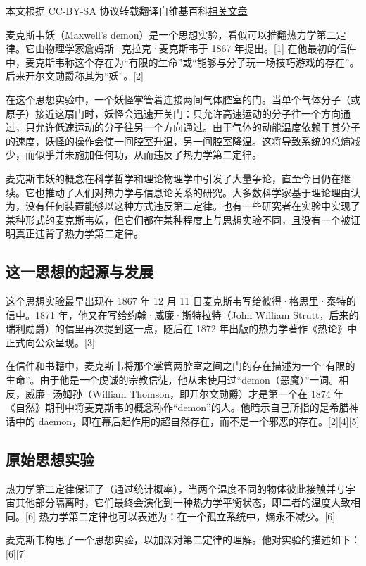 
本文根据 CC-BY-SA 协议转载翻译自维基百科\href{https://en.wikipedia.org/wiki/Maxwell\%27s_demon}{相关文章}

麦克斯韦妖（Maxwell's demon）是一个思想实验，看似可以推翻热力学第二定律。它由物理学家詹姆斯·克拉克·麦克斯韦于 1867 年提出。[1] 在他最初的信件中，麦克斯韦称这个存在为“有限的生命”或“能够与分子玩一场技巧游戏的存在”。后来开尔文勋爵称其为“妖”。[2]

在这个思想实验中，一个妖怪掌管着连接两间气体腔室的门。当单个气体分子（或原子）接近这扇门时，妖怪会迅速开关门：只允许高速运动的分子往一个方向通过，只允许低速运动的分子往另一个方向通过。由于气体的动能温度依赖于其分子的速度，妖怪的操作会使一间腔室升温，另一间腔室降温。这将导致系统的总熵减少，而似乎并未施加任何功，从而违反了热力学第二定律。

麦克斯韦妖的概念在科学哲学和理论物理学中引发了大量争论，直至今日仍在继续。它也推动了人们对热力学与信息论关系的研究。大多数科学家基于理论理由认为，没有任何装置能够以这种方式违反第二定律。也有一些研究者在实验中实现了某种形式的麦克斯韦妖，但它们都在某种程度上与思想实验不同，且没有一个被证明真正违背了热力学第二定律。
\subsection{这一思想的起源与发展}
这个思想实验最早出现在 1867 年 12 月 11 日麦克斯韦写给彼得·格思里·泰特的信中。1871 年，他又在写给约翰·威廉·斯特拉特（John William Strutt，后来的瑞利勋爵）的信里再次提到这一点，随后在 1872 年出版的热力学著作《热论》中正式向公众呈现。[3]

在信件和书籍中，麦克斯韦将那个掌管两腔室之间之门的存在描述为一个“有限的生命”。由于他是一个虔诚的宗教信徒，他从未使用过“demon（恶魔）”一词。相反，威廉·汤姆孙（William Thomson，即开尔文勋爵）才是第一个在 1874 年《自然》期刊中将麦克斯韦的概念称作“demon”的人。他暗示自己所指的是希腊神话中的 daemon，即在幕后起作用的超自然存在，而不是一个邪恶的存在。[2][4][5]
\subsection{原始思想实验}
热力学第二定律保证了（通过统计概率），当两个温度不同的物体彼此接触并与宇宙其他部分隔离时，它们最终会演化到一种热力学平衡状态，即二者的温度大致相同。[6] 热力学第二定律也可以表述为：在一个孤立系统中，熵永不减少。[6]

麦克斯韦构思了一个思想实验，以加深对第二定律的理解。他对实验的描述如下：[6][7]

